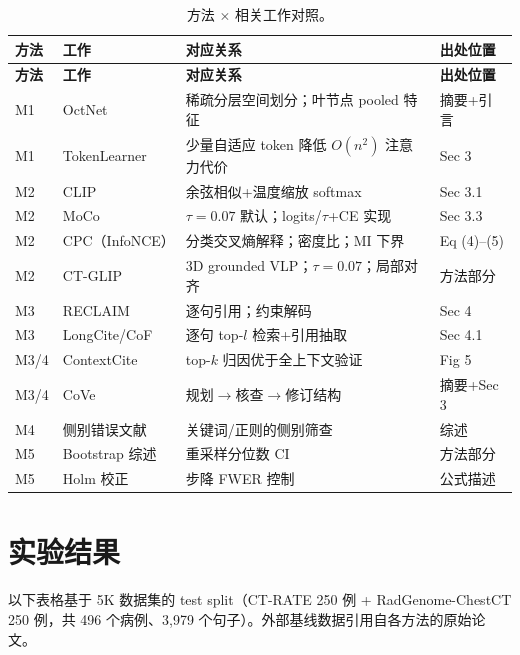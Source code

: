 \documentclass[11pt,a4paper]{article}
\theoremstyle{definition}
\begin{document}
\begin{longtable}{p{1cm}p{3cm}p{7cm}p{2.5cm}}
\caption{方法 $\times$ 相关工作对照。}\label{tab:related}\\
\toprule
\textbf{方法} & \textbf{工作} & \textbf{对应关系} & \textbf{出处位置} \\
\midrule\endfirsthead
\toprule
\textbf{方法} & \textbf{工作} & \textbf{对应关系} & \textbf{出处位置} \\
\midrule\endhead

M1 & OctNet & 稀疏分层空间划分；叶节点 pooled 特征 & 摘要+引言 \\
M1 & TokenLearner & 少量自适应 token 降低 $O(n^2)$ 注意力代价 & Sec 3 \\
M2 & CLIP & 余弦相似+温度缩放 softmax & Sec 3.1 \\
M2 & MoCo & $\tau=0.07$ 默认；logits/$\tau$+CE 实现 & Sec 3.3 \\
M2 & CPC（InfoNCE） & 分类交叉熵解释；密度比；MI 下界 & Eq (4)--(5) \\
M2 & CT-GLIP & 3D grounded VLP；$\tau=0.07$；局部对齐 & 方法部分 \\
M3 & RECLAIM & 逐句引用；约束解码 & Sec 4 \\
M3 & LongCite/CoF & 逐句 top-$l$ 检索+引用抽取 & Sec 4.1 \\
M3/4 & ContextCite & top-$k$ 归因优于全上下文验证 & Fig 5 \\
M3/4 & CoVe & 规划$\to$核查$\to$修订结构 & 摘要+Sec 3 \\
M4 & 侧别错误文献 & 关键词/正则的侧别筛查 & 综述 \\
M5 & Bootstrap 综述 & 重采样分位数 CI & 方法部分 \\
M5 & Holm 校正 & 步降 FWER 控制 & 公式描述 \\
\bottomrule
\end{longtable}

\newpage
\section{实验结果}

以下表格基于 5K 数据集的 test split（CT-RATE 250 例 + RadGenome-ChestCT 250 例，共 496 个病例、3{,}979 个句子）。外部基线数据引用自各方法的原始论文。
\end{document}
